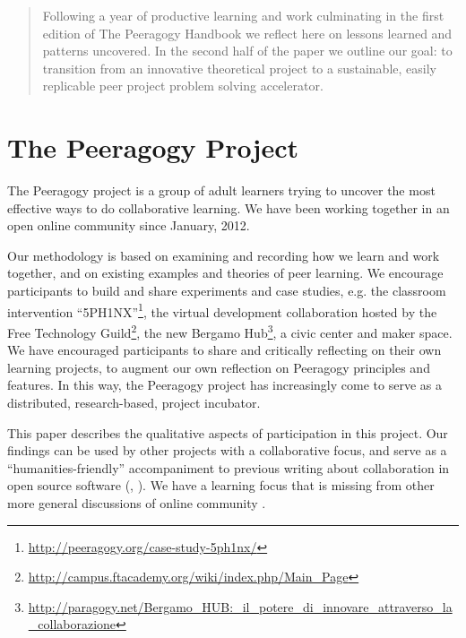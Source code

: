 \documentclass{acm_proc_article-sp}
\begin{document}


\maketitle
\begin{abstract}

Following a year of productive learning and work culminating in the first edition of The Peeragogy Handbook we reflect here on lessons learned and patterns uncovered. In the second half of the paper we outline our goal: to transition from an innovative theoretical project to a sustainable, easily replicable peer project problem solving accelerator.

\end{abstract}



\section{The Peeragogy Project}

The Peeragogy project is a group of adult learners trying to uncover
the most effective ways to do collaborative learning. We have been
working together in an open online community since January, 2012.

Our methodology is based on examining and recording how we learn and
work together, and on existing examples and theories of peer learning.
We encourage participants to build and share experiments and case
studies, e.g. the classroom intervention ``5PH1NX''\footnote{\url{http://peeragogy.org/case-study-5ph1nx/}}, the virtual
development collaboration hosted by the Free Technology Guild\footnote{\url{http://campus.ftacademy.org/wiki/index.php/Main_Page}}, the new
Bergamo Hub\footnote{\url{http://paragogy.net/Bergamo_HUB:_il_potere_di_innovare_attraverso_la_collaborazione}}, a civic center and maker space.
We have encouraged participants to share and critically reflecting on their own learning projects, to augment our own reflection on Peeragogy principles and features. In this way, the Peeragogy project has increasingly come to serve as a distributed, research-based, project incubator.

This paper describes the qualitative aspects of participation in this
project. Our findings can be used by other projects with a
collaborative focus, and serve as a ``humanities-friendly'' accompaniment to
previous writing about collaboration in open source software
(\cite{OpenAdvice}, \cite{crowstonXdefiningX2003}).  We have a learning focus that is missing from other more general discussions of online community \cite{bacon2012art}.
\end{document}
